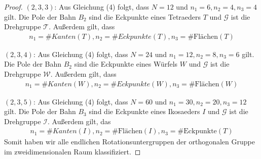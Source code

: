 \begin{proof}
	
	$(2,3,3)$: Aus Gleichung (4) folgt, dass $N = 12$ und $n_1 = 6, n_2 = 4, n_3 = 4$ gilt. Die Pole der Bahn $B_2$ sind die Eckpunkte eines Tetraeders $T$ und $\mathcal{G}$ ist die Drehgruppe $\mathcal{T}$. Außerdem gilt, dass
	\begin{align*}
	n_1 = \# Kanten(T),n_2 = \# Eckpunkte(T),n_3 = \# \text{Flächen}(T)
	\end{align*}
	
	
	$(2,3,4)$: Aus Gleichung (4) folgt, dass $N = 24$ und $n_1 = 12, n_2 = 8, n_3 = 6$ gilt. Die Pole der Bahn $B_2$ sind die Eckpunkte eines Würfels $W$ und $\mathcal{G}$ ist die Drehgruppe $\mathcal{W}$. Außerdem gilt, dass
	\begin{align*}
	n_1 = \# Kanten(W),n_2 = \# Eckpunkte(W),n_3 = \# \text{Flächen}(W)
	\end{align*}
	
	
	$(2,3,5)$: Aus Gleichung (4) folgt, dass $N = 60$ und $n_1 = 30, n_2 = 20, n_3= 12$ gilt. Die Pole der Bahn $B_3$ sind die Eckpunkte eines Ikosaeders $I$ und $\mathcal{G}$ ist die Drehgruppe $\mathcal{I}$. Außerdem gilt, das
	\begin{align*}
	n_1 = \# Kanten(I),n_2 = \# \text{Flächen}(I),n_3 = \# \text{Eckpunkte}(T)
	\end{align*}
Somit haben wir alle endlichen Rotationsuntergruppen der orthogonalen Gruppe im zweidimensionalen Raum klassifiziert.
\end{proof}
